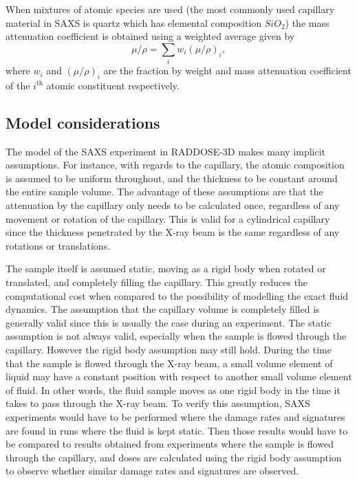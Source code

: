 When mixtures of atomic species are used (the most commonly used capillary material in SAXS is quartz which has elemental composition $SiO_2$) the mass attenuation coefficient is obtained using a weighted average given by
\begin{equation}
    \mu/\rho = \sum_i w_i (\mu/\rho)_i,
\end{equation}
where $w_i$ and $(\mu/\rho)_i$ are the fraction by weight and mass attenuation coefficient of the $i^{\text{th}}$ atomic constituent respectively.

\subsection{Model considerations}
\label{sub:Model considerations}
The model of the SAXS experiment in RADDOSE-3D makes many implicit assumptions.
For instance, with regards to the capillary, the atomic composition is assumed to be uniform throughout, and the thickness to be constant around the entire sample volume.
The advantage of these assumptions are that the attenuation by the capillary only needs to be calculated once, regardless of any movement or rotation of the capillary.
This is valid for a cylindrical capillary since the thickness penetrated by the X-ray beam is the same regardless of any rotations or translations.

The sample itself is assumed static, moving as a rigid body when rotated or translated, and completely filling the capillary.
This greatly reduces the computational cost when compared to the possibility of modelling the exact fluid dynamics.
The assumption that the capillary volume is completely filled is generally valid since this is usually the case during an experiment.
The static assumption is not always valid, especially when the sample is flowed through the capillary.
However the rigid body assumption may still hold.
During the time that the sample is flowed through the X-ray beam, a small volume element of liquid may have a constant position with respect to another small volume element of fluid.
In other words, the fluid sample moves as one rigid body in the time it takes to pass through the X-ray beam.
To verify this assumption, SAXS experiments would have to be performed where the damage rates and signatures are found in runs where the fluid is kept static.
Then those results would have to be compared to results obtained from experiments where the sample is flowed through the capillary, and doses are calculated using the rigid body assumption to observe whether similar damage rates and signatures are observed.

